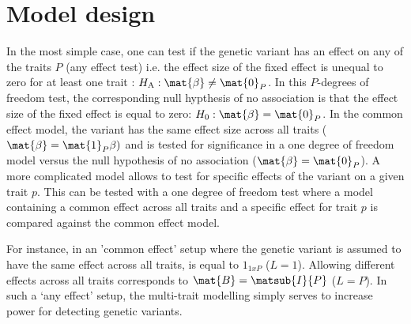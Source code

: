 \section{Model design}
\label{section:model-design}
In the most simple case, one can test if the genetic variant has an effect on any of the traits \(P\) (any effect test) i.e. the effect size of the fixed effect is unequal to zero for at least one trait : \(H_\text{A}: \mat{\beta} \ne \mat{0}_P\).  In this \(P\)-degrees of freedom test, the corresponding null hypthesis of no association is that the effect size of the fixed effect is equal to zero: \(H_0:\mat{\beta}  = \mat{0}_P\). In the common effect model, the variant has the same effect size across all traits (\(\mat{\beta}  = \mat{1}_P\beta)\) and is tested for significance in a one degree of freedom model versus the null hypothesis of no association (\(\mat{\beta}  = \mat{0}_P\)). A more complicated model allows to test for specific effects of the variant on a given trait \(p\). This can be tested with a one degree of freedom test where a model containing a common effect across all traits and a specific effect for trait \(p\) is compared against the common effect model.

For instance, in an 'common effect' setup where the genetic variant is assumed to have the same effect across all traits,   is equal to \(1_{1xP}\) (\(L=1\)). Allowing different effects across all traits corresponds to  \( \mat{B} =  \matsub{I}{P} \) (\(L=P\)). In such a `any effect' setup, the multi-trait modelling simply serves to increase power for detecting genetic variants. 